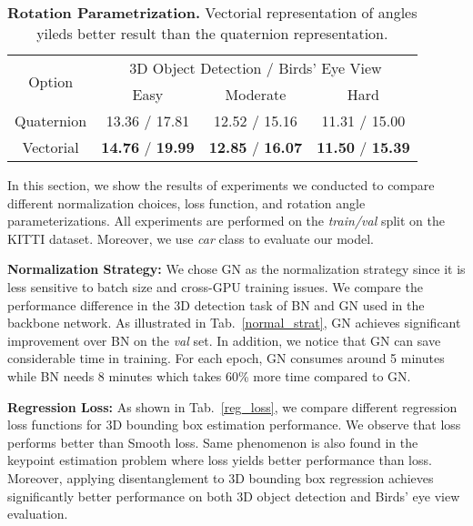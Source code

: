 \documentclass[10pt,twocolumn,letterpaper]{article}
\renewcommand{\paragraph}[1]{

        \vspace{3pt}
	\noindent\textbf{#1}}
\begin{document}
    \begin{table}[t]
    \centering
        \begin{tabular}{c||ccc}
        \hline
        \multirow{2}{*}{Option} & \multicolumn{3}{c}{3D Object Detection / Birds' Eye View}          \\ \cline{2-4} 
                        & Easy                                & Moderate                         & Hard        \\ \hline
        Quaternion      & 13.36 / 17.81                       & 12.52 / 15.16                    & 11.31 / 15.00   \\
        Vectorial     & \textbf{14.76} / \textbf{19.99}     & \textbf{12.85} / \textbf{16.07}  & \textbf{11.50} / \textbf{15.39}   \\ \hline 
        
        \end{tabular} \vspace{2mm}
        \caption{\textbf{Rotation Parametrization.}  Vectorial representation of angles yileds better result than the quaternion representation.}
        \label{rot_param}\vspace{-3mm}
    \end{table}
    In this section, we show the results of experiments we conducted to compare different normalization choices, loss function, and rotation angle parameterizations. All experiments are performed on the \textit{train/val} split on the KITTI dataset. Moreover, we use \textit{car} class to evaluate our model.
    
    \paragraph{Normalization Strategy:} 
    We chose GN as the normalization strategy since it is less sensitive to batch size and cross-GPU training issues. We compare the performance difference in the 3D detection task of BN and GN used in the backbone network. As illustrated in Tab.~\ref{normal_strat}, GN achieves significant improvement over BN on the \emph{val} set. In addition, we notice that GN can save considerable time in training. For each epoch, GN consumes around 5 minutes while BN needs 8 minutes which takes 60\% more time compared to GN.

    \paragraph{Regression Loss:} 
    As shown in Tab.~\ref{reg_loss}, we compare different regression loss functions for 3D bounding box estimation performance. We observe that  loss performs better than Smooth  loss. Same phenomenon is also found in the keypoint estimation problem \cite{centernet_2019} where  loss yields better performance than  loss. Moreover, applying disentanglement to 3D bounding box regression achieves significantly better performance on both 3D object detection and Birds' eye view evaluation.
\end{document}

